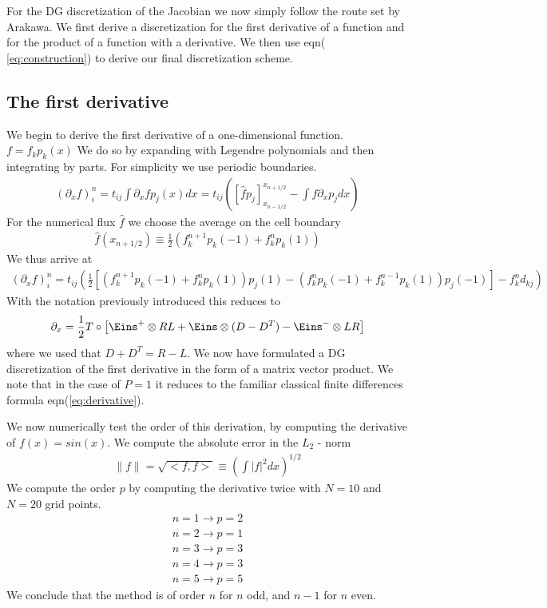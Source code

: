 \documentclass[a4paper,12pt]{scrartcl}
\begin{document}
For the DG discretization of the Jacobian we now simply follow the route set by
Arakawa. We first derive a discretization for the first derivative of a function
and for the product of a function with a derivative. We then use eqn( \ref{eq:construction}) to derive our final discretization scheme. 

\subsection{ The first derivative}
We begin to derive the first derivative of a one-dimensional function.
$ f = f_kp_k(x)$
We do so
by expanding with Legendre polynomials and then integrating by parts. For 
simplicity we use periodic boundaries. 
\begin{align}
    (\partial_x f)^n_i = t_{ij}\int\partial_x f p_j(x) dx = t_{ij}\left( [\hat fp_j]_{x_{n-1/2}}^{x_{n+1/2}} - \int f \partial_x p_j dx \right)
    \label{}
\end{align}
For the numerical flux $\hat f$ we choose the average on the cell boundary
\begin{align}
    \hat f(x_{n+1/2}) \equiv \frac{1}{2}(f^{n+1}_kp_k(-1) + f^n_k p_k(1))
    \label{}
\end{align}
We thus arrive at
\begin{align}
    (\partial_x f)^n_i= t_{ij}\left(  \frac{1}{2}[(f^{n+1}_kp_k(-1)+ f^n_kp_k(1))p_j(1) 
                - (f^n_kp_k(-1) + f^{n-1}_kp_k(1))p_j(-1)] - f^n_k d_{kj} \right)
    \label{}
\end{align}
With the notation previously introduced this reduces to 
\begin{align}
    \partial_x = \frac{1}{2}T\circ \left[ \Eins^+\otimes RL + \Eins \otimes (D-D^T) - \Eins^-\otimes LR\right]
    \label{}
\end{align}
where we used that $D+D^T = R-L$. We now have formulated a DG discretization of the first derivative in the form of a matrix vector product. 
We note that in the case of $P = 1$ it reduces to the familiar classical finite
differences formula eqn(\ref{eq:derivative}).

We now numerically test the order of this derivation, by computing the derivative
of $f(x) = sin(x)$. We compute the absolute error in the $L_2$ - norm 
\begin{align}
    \lVert f\rVert = \sqrt{ <f,f>} \equiv \left( \int |f|^2 dx \right)^{1/2}
    \label{eq:norm}
\end{align}
We compute the order $p$ by computing the derivative twice with $N=10$ and $N=20$ grid
points.
\begin{align*}
    n = 1 \rightarrow p = 2 \\
    n = 2 \rightarrow p = 1 \\
    n = 3 \rightarrow p = 3 \\
    n = 4 \rightarrow p = 3 \\
    n = 5 \rightarrow p = 5
\end{align*}
We conclude that the method is of order $n$ for $n$ odd, and $n-1$ for $n$ even. 
\end{document}
